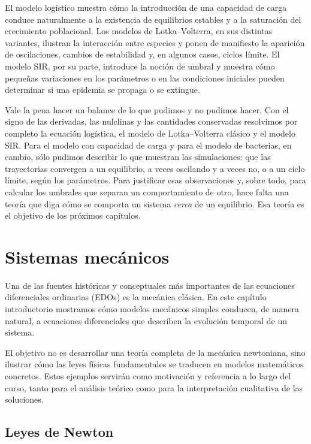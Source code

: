 \documentclass[12pt, a4paper]{amsbook}
\theoremstyle{remark}
\theoremstyle{definition}
\numberwithin{section}{chapter}
\numberwithin{subsection}{section}
\numberwithin{equation}{section}
\numberwithin{figure}{chapter}
\begin{document}
El modelo logístico muestra cómo la introducción de una capacidad de carga conduce naturalmente a la existencia de equilibrios estables y a la saturación del crecimiento poblacional. Los modelos de Lotka--Volterra, en sus distintas variantes, ilustran la interacción entre especies y ponen de manifiesto la aparición de oscilaciones, cambios de estabilidad y, en algunos casos, ciclos límite. El modelo SIR, por su parte, introduce la noción de umbral y muestra cómo pequeñas variaciones en los parámetros o en las condiciones iniciales pueden determinar si una epidemia se propaga o se extingue.

Vale la pena hacer un balance de lo que pudimos y no pudimos hacer. Con el signo de las derivadas, las nulclinas y las cantidades conservadas resolvimos por completo la ecuación logística, el modelo de Lotka--Volterra clásico y el modelo SIR. Para el modelo con capacidad de carga y para el modelo de bacterias, en cambio, sólo pudimos describir lo que muestran las simulaciones: que las trayectorias convergen a un equilibrio, a veces oscilando y a veces no, o a un ciclo límite, según los parámetros. Para justificar esas observaciones y, sobre todo, para calcular los umbrales que separan un comportamiento de otro, hace falta una teoría que diga cómo se comporta un sistema \emph{cerca} de un equilibrio. Esa teoría es el objetivo de los próximos capítulos.

\chapter{Sistemas mecánicos}\label{sec:sistemas-mecanicos}

Una de las fuentes históricas y conceptuales más importantes de las ecuaciones diferenciales ordinarias (EDOs) es la mecánica clásica. En este capítulo introductorio mostramos cómo modelos mecánicos simples conducen, de manera natural, a ecuaciones diferenciales que describen la evolución temporal de un sistema.

El objetivo no es desarrollar una teoría completa de la mecánica newtoniana, sino ilustrar cómo las leyes físicas fundamentales se traducen en modelos matemáticos concretos. Estos ejemplos servirán como motivación y referencia a lo largo del curso, tanto para el análisis teórico como para la interpretación cualitativa de las soluciones.

\section{Leyes de Newton}
\end{document}
